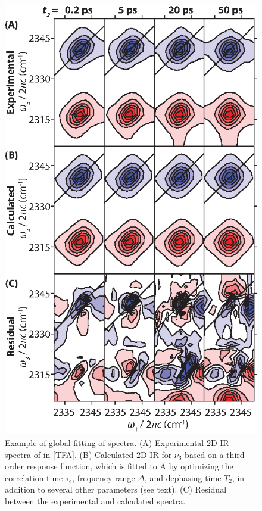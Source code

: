 {\begin{figure}
  \centering
  \includegraphics[scale=1.25]{./paper_01/fig8.eps}
  \caption[Example of global fitting of 2D-IR spectra]{\label{fig:TFA 2D fit}Example of global fitting of spectra. (A) Experimental 2D-IR spectra of  in \ce{[Im_{4,1}]}[TFA]. (B) Calculated 2D-IR for \(\nu_3\) based on a third-order response function, which is fitted to A by optimizing the correlation time \(\tau_c\), frequency range \(\Delta\), and dephasing time \(T_2\), in addition to several other parameters (see text). (C) Residual between the experimental and calculated spectra.}
\end{figure}

}
